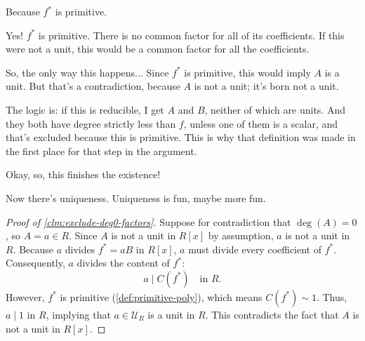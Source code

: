 \begin{proofWrapper}
\begin{student}
Because $f^*$ is primitive.
\end{student}

\begin{speech}[00:29:48 - 00:30:58]
Yes! $f^*$ is primitive. There is no common factor for all of its coefficients. If this were not a unit, this would be a common factor for all the coefficients.

So, the only way this happens... Since $f^*$ is primitive, this would imply $A$ is a unit.  But that's a contradiction, because $A$ is not a unit; it's born not a unit. 

The logic is: if this is reducible, I get $A$ and $B$, neither of which are units. And they both have degree strictly less than $f$, unless one of them is a scalar, and that's excluded because this is primitive. This is why that definition was made in the first place for that step in the argument.

Okay, so, this finishes the existence!

Now there's uniqueness. Uniqueness is fun, maybe more fun.
\end{speech}

\begin{content}

\begin{proof}[Proof of \cref{clm:exclude-deg0-factors}]
Suppose for contradiction that $\deg(A) = 0$, so $A = a \in R$.
Since $A$ is not a unit in $R[x]$ by assumption, $a$ is not a unit in $R$.
Because $a$ divides $f^* = aB$ in $R[x]$, $a$ must divide every coefficient of $f^*$.
Consequently, $a$ divides the content of $f^*$:
\[
a \mid C(f^*) \quad \text{in } R.
\]
However, $f^*$ is primitive (\cref{def:primitive-poly}), which means $C(f^*) \sim 1$. Thus, $a \mid 1$ in $R$, implying that $a \in \mathcal{U}_R$ is a unit in $R$.
This contradicts the fact that $A$ is not a unit in $R[x]$.
\end{proof}


\end{content}
\end{proofWrapper}
